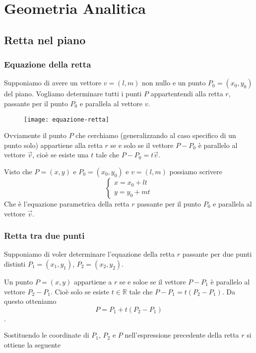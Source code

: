 \chapter{Geometria Analitica}

\section{Retta nel piano}

\subsection{Equazione della retta}

Supponiamo di avere un vettore $v = (l,m)$ non nullo e un punto $P_0 = (x_0,y_0)$ del piano. Vogliamo determinare tutti i punti $P$ appartentendi alla retta $r$, passante per il punto $P_0$ e parallela al vettore $v$.

\begin{figure}[H]
\texttt{[image: equazione-retta]}
\centering
\end{figure}

Ovviamente il punto $P$ che cerchiamo (generalizzando al caso specifico di un punto solo) appartiene alla retta $r$ se e solo se il vettore $P-P_0$ è parallelo al vettore $\vec{v}$, cioè se esiste una $t$ tale che $P-P_0=t\vec{v}$.

Visto che $P=(x,y)$ e $P_0=(x_0,y_0)$ e $v = (l,m)$ possiamo scrivere
$$
\begin{cases}
x = x_0 + lt \\
y = y_0 + mt
\end{cases}
$$
Che è l'equazione parametrica della retta $r$ passante per il punto $P_0$ e parallela al vettore $\vec{v}$.

\subsection{Retta tra due punti}

Supponiamo di voler determinare l'equazione della retta $r$ passante per due punti distinti $P_1=(x_1,y_1)$, $P_2=(x_2,y_2)$.

Un punto $P=(x,y)$ appartiene a $r$ se e soloe se il vettore $P-P_1$ è parallelo al vettore $P_2-P_1$. Cioè solo se esiste $t  \in \mathbb{R}$ tale che $P-P_1=t(P_2-P_1)$. Da questo otteniamo $$P = P_1+t(P_2-P_1)$$.

Sostituendo le coordinate di $P_1$, $P_2$ e $P$ nell'espressione precedente della retta $r$ si ottiene la seguente


